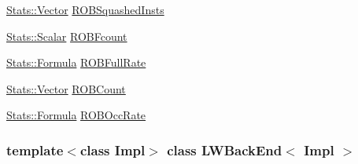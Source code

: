 \begin{DoxyCompactItemize}
\hyperlink{classStats_1_1Vector}{Stats::Vector} \hyperlink{classLWBackEnd_ae0e4c1bd43a0cb1f736062e536168fa3}{ROBSquashedInsts}
\item 
\hyperlink{classStats_1_1Scalar}{Stats::Scalar} \hyperlink{classLWBackEnd_afdfe647a67d89f9620c69019c79547be}{ROBFcount}
\item 
\hyperlink{classStats_1_1Formula}{Stats::Formula} \hyperlink{classLWBackEnd_a26d90e83e9d707184d857b5df610d726}{ROBFullRate}
\item 
\hyperlink{classStats_1_1Vector}{Stats::Vector} \hyperlink{classLWBackEnd_a39034d47fcced7afdc840710ff261574}{ROBCount}
\item 
\hyperlink{classStats_1_1Formula}{Stats::Formula} \hyperlink{classLWBackEnd_afb382907daa4161f6ea36acfab3a1c40}{ROBOccRate}
\end{DoxyCompactItemize}
\subsubsection*{template$<$class Impl$>$ class LWBackEnd$<$ Impl $>$}



